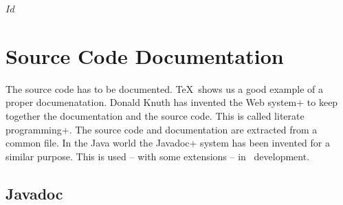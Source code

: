 \SVN$Id$
\chapter{Source Code Documentation}


The source code has to be documented. \TeX\ shows us a good example of
a proper documenatation. Donald Knuth has invented
the \+Web system+ to keep together the documentation and the source code.
This is called \+literate programming+. The source code and
documentation are extracted from a common file. In the Java world the
\+Javadoc+ system has been invented for a similar purpose. This is
used -- with some extensions -- in \ExTeX\ development.


\section{Javadoc}

